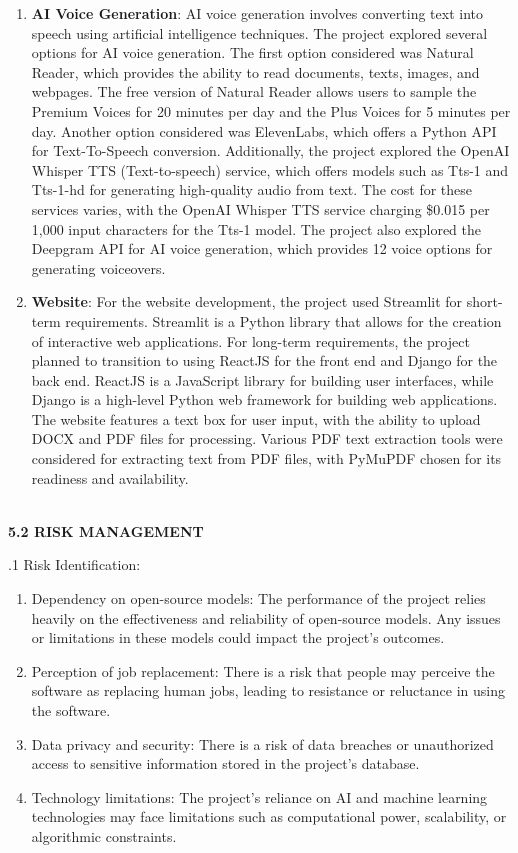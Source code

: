 \documentclass[12pt]{article}
\begin{document}
\begin{enumerate}
\item \textbf{AI Voice Generation}: AI voice generation involves converting text into speech using artificial intelligence techniques. The project explored several options for AI voice generation. The first option considered was Natural Reader, which provides the ability to read documents, texts, images, and webpages. The free version of Natural Reader allows users to sample the Premium Voices for 20 minutes per day and the Plus Voices for 5 minutes per day. Another option considered was ElevenLabs, which offers a Python API for Text-To-Speech conversion. Additionally, the project explored the OpenAI Whisper TTS (Text-to-speech) service, which offers models such as Tts-1 and Tts-1-hd for generating high-quality audio from text. The cost for these services varies, with the OpenAI Whisper TTS service charging \$0.015 per 1,000 input characters for the Tts-1 model. The project also explored the Deepgram API for AI voice generation, which provides 12 voice options for generating voiceovers.

\item \textbf{Website}: For the website development, the project used Streamlit for short-term requirements. Streamlit is a Python library that allows for the creation of interactive web applications. For long-term requirements, the project planned to transition to using ReactJS for the front end and Django for the back end. ReactJS is a JavaScript library for building user interfaces, while Django is a high-level Python web framework for building web applications. The website features a text box for user input, with the ability to upload DOCX and PDF files for processing. Various PDF text extraction tools were considered for extracting text from PDF files, with PyMuPDF chosen for its readiness and availability.\\

\end{enumerate}\\


\justify \textbf{5.2 RISK MANAGEMENT}

.1 Risk Identification:
\begin{enumerate}
    \item Dependency on open-source models: The performance of the project relies heavily on the effectiveness and reliability of open-source models. Any issues or limitations in these models could impact the project's outcomes.

\item 
Perception of job replacement: There is a risk that people may perceive the software as replacing human jobs, leading to resistance or reluctance in using the software.
\item Data privacy and security: There is a risk of data breaches or unauthorized access to sensitive information stored in the project's database.
\item Technology limitations: The project's reliance on AI and machine learning technologies may face limitations such as computational power, scalability, or algorithmic constraints.

\end{enumerate}
\bigskip
\bigskip
\end{document}
